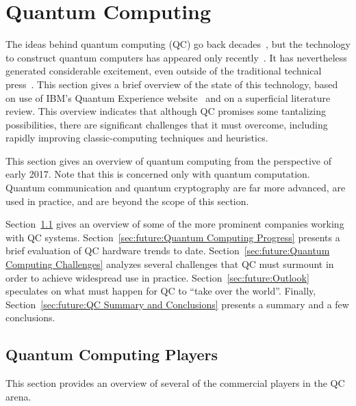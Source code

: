 
\section{Quantum Computing}
\label{sec:future:Quantum Computing}

The ideas behind quantum computing (QC) go back
decades~\cite{RichardPFeynman1959RoomAtBottom,Bennett:1973:LRC:1664562.1664568,RichardFeynman1986QuantumMechanicalComputers},
but the technology to construct quantum computers has appeared
only recently~\cite{KamranKarimi2011D-WaveAdiabatic,IBM2016QuantumExperience}.
It has nevertheless generated considerable excitement,
even outside of the traditional technical
press~\cite{Economist2017QuantumComputingTechnologyQuarterly}.
This section gives a brief overview of the state of this
technology, based on use of IBM's Quantum Experience
website~\cite{IBM2016QuantumExperience} and on a superficial
literature review.
This overview indicates that although QC promises some
tantalizing possibilities, there are significant challenges
that it must overcome, including rapidly improving classic-computing
techniques and heuristics.

This section gives an overview of quantum computing from the perspective
of early 2017.
Note that this is concerned only with quantum computation.
Quantum communication and quantum cryptography are far more
advanced, are used in practice, and are beyond the scope of
this section.

Section~\ref{sec:future:Quantum Computing Players}
gives an overview of some of the more prominent companies working
with QC systems.
Section~\ref{sec:future:Quantum Computing Progress}
presents a brief evaluation of QC hardware trends to date.
Section~\ref{sec:future:Quantum Computing Challenges}
analyzes several challenges that QC must surmount in order to achieve
widespread use in practice.
Section~\ref{sec:future:Outlook} speculates on what must happen for QC
to ``take over the world''.
Finally,
Section~\ref{sec:future:QC Summary and Conclusions}
presents a summary and a few conclusions.

\subsection{Quantum Computing Players}
\label{sec:future:Quantum Computing Players}

This section provides an overview of several of the commercial
players in the QC arena.

